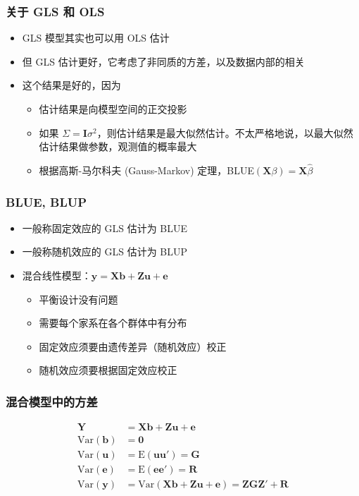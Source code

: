 \documentclass[serif,aspectratio=169]{beamer}
\begin{document}
\begin{frame}
  \frametitle{关于 GLS 和 OLS}
  \begin{itemize}
  \item GLS 模型其实也可以用 OLS 估计
  \item 但 GLS 估计更好，它考虑了非同质的方差，以及数据内部的相关
  \item 这个结果是好的，因为
    \begin{itemize}
    \item 估计结果是向模型空间的正交投影
    \item 如果 $\Sigma=\mathbf{I}\sigma^2$，则估计结果是最大似然估计。不太严格地说，以最大似然估计结果做参数，观测值的概率最大
    \item 根据高斯-马尔科夫 (Gauss-Markov) 定理，BLUE$(\mathbf{X}\beta) =\mathbf{X}\hat{\beta}$
    \end{itemize}
  \end{itemize}
\end{frame}


\begin{frame}
  \frametitle{BLUE, BLUP}
  \begin{itemize}
  \item 一般称固定效应的 GLS 估计为 BLUE
  \item 一般称随机效应的 GLS 估计为 BLUP
  \item 混合线性模型：$\mathbf{y=Xb+Zu+e}$
    \begin{itemize}
    \item 平衡设计没有问题
    \item 需要每个家系在各个群体中有分布
    \item 固定效应须要由遗传差异（随机效应）校正
    \item 随机效应须要根据固定效应校正
    \end{itemize}
  \end{itemize}
\end{frame}


\begin{frame}
  \frametitle{混合模型中的方差}
  \begin{align*}
    \mathbf{Y} & = \mathbf{Xb+Zu+e}\\
    \mathrm{Var}(\mathbf{b}) &=\mathbf{0}\\
    \mathrm{Var}(\mathbf{u}) &=\mathrm{E}(\mathbf{uu'}) = \mathbf{G}\\
    \mathrm{Var}(\mathbf{e}) &=\mathrm{E}(\mathbf{ee'}) = \mathbf{R}\\
    \mathrm{Var}(\mathbf{y}) &=\mathrm{Var}(\mathbf{Xb+Zu+e})=\mathbf{ZGZ'+R}
  \end{align*}
\end{frame}
\end{document}
